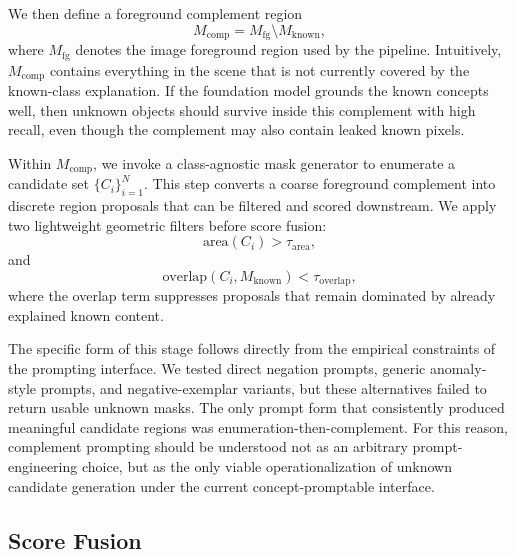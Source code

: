 \documentclass[a4paper,fleqn]{cas-dc}
\begin{document}
We then define a foreground complement region
\begin{equation}
M_{\text{comp}} = M_{\text{fg}} \setminus M_{\text{known}},
\end{equation}
where $M_{\text{fg}}$ denotes the image foreground region used by the pipeline. Intuitively, $M_{\text{comp}}$ contains everything in the scene that is not currently covered by the known-class explanation. If the foundation model grounds the known concepts well, then unknown objects should survive inside this complement with high recall, even though the complement may also contain leaked known pixels.

Within $M_{\text{comp}}$, we invoke a class-agnostic mask generator to enumerate a candidate set $\{C_i\}_{i=1}^{N}$. This step converts a coarse foreground complement into discrete region proposals that can be filtered and scored downstream. We apply two lightweight geometric filters before score fusion:
\begin{equation}
\text{area}(C_i) > \tau_{\text{area}},
\end{equation}
and
\begin{equation}
\text{overlap}(C_i, M_{\text{known}}) < \tau_{\text{overlap}},
\end{equation}
where the overlap term suppresses proposals that remain dominated by already explained known content.

The specific form of this stage follows directly from the empirical constraints of the prompting interface. We tested direct negation prompts, generic anomaly-style prompts, and negative-exemplar variants, but these alternatives failed to return usable unknown masks. The only prompt form that consistently produced meaningful candidate regions was enumeration-then-complement. For this reason, complement prompting should be understood not as an arbitrary prompt-engineering choice, but as the only viable operationalization of unknown candidate generation under the current concept-promptable interface.

\subsection{Score Fusion}
\label{sec:method:fusion}
\end{document}
